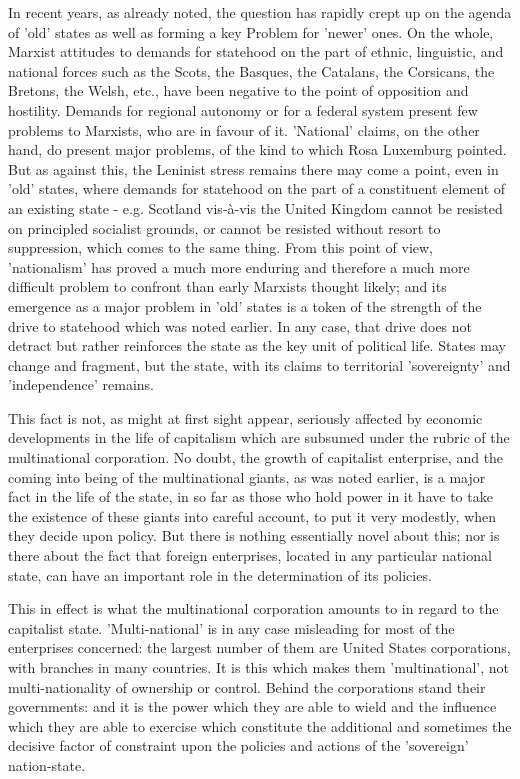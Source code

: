 In recent years, as already noted, the question has rapidly crept up on the agenda of 'old' states as well as forming a key Problem for 'newer' ones. On the whole, Marxist attitudes to demands for statehood on the part of ethnic, linguistic, and  national forces such as the Scots, the Basques, the Catalans, the Corsicans, the Bretons, the Welsh, etc., have been negative to the point of opposition and hostility. Demands for regional autonomy or for a federal system present few problems to Marxists, who are in favour of it. 'National' claims, on the other hand, do present major problems, of the kind to which Rosa Luxemburg pointed. But as against this, the Leninist stress remains there may come a point, even in 'old' states, where demands for statehood on the part of a constituent element of an existing state - e.g. Scotland vis-à-vis the United Kingdom cannot be resisted on principled socialist grounds, or cannot be resisted without resort to suppression, which comes to the same thing. From this point of view, 'nationalism' has proved a much more enduring and therefore a much more difficult problem to confront than early Marxists thought likely; and its emergence as a major problem in 'old' states is a token of the strength of the drive to statehood which was noted earlier. In any case, that drive does not detract but rather reinforces the state as the key unit of political life. States may change and fragment, but the state, with its claims to territorial 'sovereignty' and 'independence' remains.

This fact is not, as might at first sight appear, seriously affected by economic developments in the life of capitalism which are subsumed under the rubric of the multinational corporation. No doubt, the growth of capitalist enterprise, and the coming into being of the multinational giants, as was noted earlier, is a major fact in the life of the state, in so far as those who hold power in it have to take the existence of these giants into careful account, to put it very modestly, when they decide upon policy. But there is nothing essentially novel about this; nor is there about the fact that foreign enterprises, located in any particular national state, can have an important role in the determination of its policies.

This in effect is what the multinational corporation amounts to in regard to the capitalist state. 'Multi-national' is in any case misleading for most of the enterprises concerned: the largest number of them are United States corporations, with branches in many countries. It is this which makes them 'multinational', not multi-nationality of ownership or control. Behind the corporations stand their governments: and it is the power which they are able to wield and the influence which they are able to exercise which constitute the additional and sometimes the decisive factor of constraint upon the policies and actions of the 'sovereign' nation-state.

